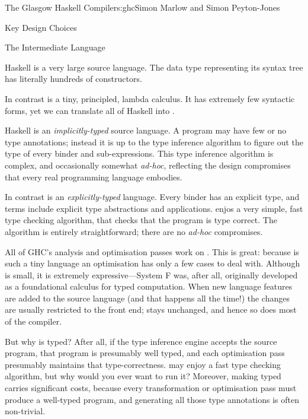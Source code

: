 \begin{aosachapter}{The Glasgow Haskell Compiler}{s:ghc}{Simon Marlow and Simon Peyton-Jones}
\begin{aosasect1}{Key Design Choices}
\begin{aosasect2}{The Intermediate Language}
\begin{aosaitemize}

\item Haskell is a very large source language.  The data type
  representing its syntax tree has literally hundreds of constructors.

  In contrast \Core{} is a tiny, principled, lambda calculus.  It has
  extremely few syntactic forms, yet we can translate all of Haskell
  into \Core{}.

\item Haskell is an \emph{implicitly-typed} source language.  A
  program may have few or no type annotations; instead it is up to the
  type inference algorithm to figure out the type of every binder and
  sub-expressions.  This type inference algorithm is complex, and
  occasionally somewhat \emph{ad-hoc}, reflecting the design
  compromises that every real programming language embodies.

  In contrast \Core{} is an \emph{explicitly-typed} language.  Every
  binder has an explicit type, and terms include explicit type
  abstractions and applications.  \Core{} enjos a very simple, fast
  type checking algorithm, that checks that the program is type
  correct.  The algorithm is entirely straightforward; there are no
  \emph{ad-hoc} compromises.

\end{aosaitemize}

All of GHC's analysis and optimisation passes work on \Core{}. This is
great: because \Core{} is such a tiny language an optimisation has
only a few cases to deal with.  Although \Core{} is small, it is
extremely expressive---System F was, after all, originally developed
as a foundational calculus for typed computation.  When new language
features are added to the source language (and that happens all the
time!) the changes are usually restricted to the front end; \Core{}
stays unchanged, and hence so does most of the compiler.

But why is \Core{} typed?  After all, if the type inference engine
accepts the source program, that program is presumably well typed, and
each optimisation pass presumably maintains that type-correctness.
\Core{} may enjoy a fast type checking algorithm, but why would you
ever want to run it?  Moreover, making \Core{} typed carries
significant costs, because every transformation or optimisation pass
must produce a well-typed program, and generating all those type
annotations is often non-trivial.


\end{aosasect2}
\end{aosasect1}
\end{aosachapter}
